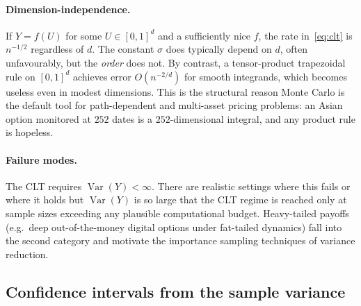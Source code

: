 \documentclass[11pt,a4paper]{article}
\theoremstyle{plain}
\theoremstyle{definition}
\theoremstyle{remark}
\newcommand{\Var}{\operatorname{Var}}
\begin{document}
\paragraph{Dimension-independence.} If $Y = f(U)$ for some
$U \in [0,1]^d$ and a sufficiently nice $f$, the rate
in~\eqref{eq:clt} is $n^{-1/2}$ regardless of $d$. The constant
$\sigma$ does typically depend on $d$, often unfavourably, but the
\emph{order} does not. By contrast, a tensor-product trapezoidal rule
on $[0,1]^d$ achieves error $O(n^{-2/d})$ for smooth integrands, which
becomes useless even in modest dimensions. This is the structural
reason Monte Carlo is the default tool for path-dependent and
multi-asset pricing problems: an Asian option monitored at $252$ dates
is a $252$-dimensional integral, and any product rule is hopeless.

\paragraph{Failure modes.} The CLT requires $\Var(Y) < \infty$. There
are realistic settings where this fails or where it holds but
$\Var(Y)$ is so large that the CLT regime is reached only at sample
sizes exceeding any plausible computational budget. Heavy-tailed payoffs
(e.g.\ deep out-of-the-money digital options under fat-tailed dynamics)
fall into the second category and motivate the importance sampling
techniques of variance reduction.

\subsection{Confidence intervals from the sample variance}
\label{sec:ci}
\end{document}
